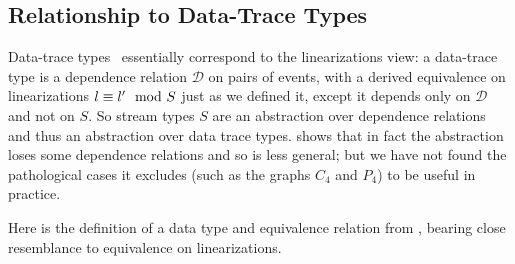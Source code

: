 %
%

\subsection{Relationship to Data-Trace Types}

Data-trace types~ essentially correspond to
the linearizations view: a data-trace type is a dependence relation
$\mathcal{D}$ on pairs of events,
with a derived equivalence on linearizations $l \equiv l' \mod {S}$
just as we defined it, except it depends only on $\mathcal{D}$ and not on
$S$.
So stream types $S$ are an abstraction over dependence relations and thus an abstraction over data trace types.
 shows that in fact the abstraction loses some dependence relations and so is less general; but we have not found the pathological cases it excludes (such as the graphs $C_4$ and $P_4$) to be useful in practice.

Here is the definition of a data type and equivalence relation from , bearing close resemblance to equivalence on linearizations.

